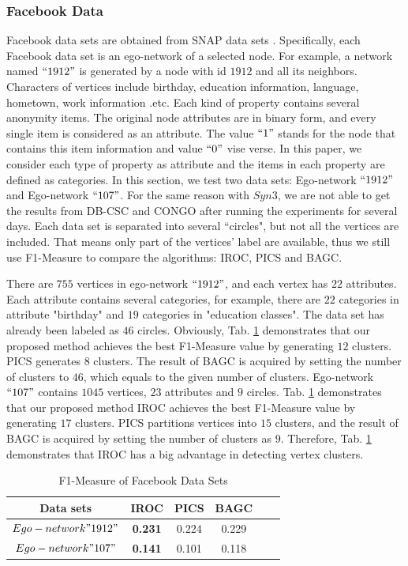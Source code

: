 \subsubsection{Facebook Data}
Facebook data sets are obtained from SNAP data sets \cite{DBLP:conf/nips/McAuleyL12}. Specifically, each Facebook data set is an ego-network of a selected node. For example, a network named $``1912"$ is generated by a node with id $1912$ and all its neighbors. Characters of vertices include birthday, education information, language, hometown, work information .etc. Each kind of property contains several anonymity items. The original node attributes are in binary form, and every single item is considered as an attribute. The value $``1"$ stands for the node that contains this item information and value $``0"$ vise verse. In this paper, we consider each type of property as attribute and the items in each property are defined as categories. In this section, we test two data sets: Ego-network $``1912"$ and Ego-network $``107"$. For the same reason with $Syn3$, we are not able to get the results from DB-CSC and CONGO after running the experiments for several days. Each data set is separated into several ``circles", but not all the vertices are included. That means only part of the vertices' label are available, thus we still use F1-Measure to compare the algorithms: IROC, PICS and BAGC. 

There are $755$ vertices in ego-network $``1912"$, and each vertex has $22$ attributes. Each attribute contains several categories, for example, there are $22$ categories in attribute "birthday" and $19$ categories in "education classes". The data set has already been labeled as $46$ circles. Obviously, Tab. \ref{tab:fmeasure1912} demonstrates that our proposed method achieves the best F1-Measure value by generating $12$ clusters. PICS generates $8$ clusters. The result of BAGC is acquired by setting the number of clusters to $46$, which equals to the given number of clusters. Ego-network $``107"$ contains $1045$ vertices, $23$ attributes and $9$ circles. Tab. \ref{tab:fmeasure1912} demonstrates that our proposed method IROC achieves the best F1-Measure value by generating $17$ clusters. PICS partitions vertices into $15$ clusters, and the result of BAGC is acquired by setting the number of clusters as $9$. Therefore, Tab.  \ref{tab:fmeasure1912} demonstrates that IROC has a big advantage in detecting vertex clusters.

\begin{table}[t]
\center\caption{F1-Measure of Facebook Data Sets }
\begin{tabular}{|c|c|c|c|c|c|}
\hline
Data sets & IROC  & PICS & BAGC \\
\hline
$Ego-network "1912"$& \textbf{0.231} & 0.224 & 0.229\\
\hline
$Ego-network "107"$& \textbf{0.141} & 0.101 & 0.118\\
\hline
\end{tabular}
\label{tab:fmeasure1912}
\end{table}

